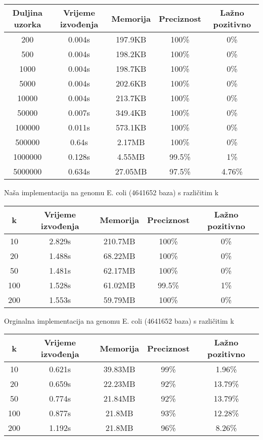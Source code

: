 \documentclass[seminarskirad]{fer}
\begin{document}
\begin{center}
\begin{tabular}{||c c c c c||} 
 \hline
 Duljina uzorka & Vrijeme izvođenja & Memorija & Preciznost & Lažno pozitivno \\ [0.5ex] 
 \hline\hline
 200 & 0.004s & 197.9KB & 100\% & 0\% \\ 
 \hline
 500 & 0.004s & 198.2KB & 100\% & 0\% \\
 \hline
 1000 & 0.004s & 198.7KB & 100\% & 0\% \\
 \hline
 5000 & 0.004s & 202.6KB & 100\% & 0\% \\
 \hline
 10000 & 0.004s & 213.7KB & 100\% & 0\% \\
 \hline
 50000 & 0.007s & 349.4KB & 100\% & 0\% \\ 
 \hline
 100000 & 0.011s & 573.1KB & 100\% & 0\% \\
 \hline
 500000 & 0.64s & 2.17MB & 100\% & 0\% \\
 \hline
 1000000 & 0.128s & 4.55MB & 99.5\% & 1\% \\
 \hline
 5000000 & 0.634s & 27.05MB & 97.5\% & 4.76\% \\ [1ex] 
 \hline
\end{tabular}
\end{center}

Naša implementacija na genomu E. coli (4641652 baza) s različitim k

\begin{center}
\begin{tabular}{||c c c c c||} 
 \hline
 k & Vrijeme izvođenja & Memorija & Preciznost & Lažno pozitivno \\ [0.5ex] 
 \hline\hline
 10 & 2.829s & 210.7MB & 100\% & 0\% \\ 
 \hline
 20 & 1.488s & 68.22MB & 100\% & 0\% \\
 \hline
 50 & 1.481s & 62.17MB & 100\% & 0\% \\
 \hline
 100 & 1.528s & 61.02MB & 99.5\% & 1\% \\
 \hline
 200 & 1.553s & 59.79MB & 100\% & 0\% \\ [1ex] 
 \hline
\end{tabular}
\end{center}

Orginalna implementacija na genomu E. coli (4641652 baza) s različitim k

\begin{center}
\begin{tabular}{||c c c c c||} 
 \hline
 k & Vrijeme izvođenja & Memorija & Preciznost & Lažno pozitivno \\ [0.5ex] 
 \hline\hline
 10 & 0.621s & 39.83MB & 99\% & 1.96\% \\ 
 \hline
 20 & 0.659s & 22.23MB & 92\% & 13.79\% \\
 \hline
 50 & 0.774s & 21.84MB & 92\% & 13.79\% \\
 \hline
 100 & 0.877s & 21.8MB & 93\% & 12.28\% \\
 \hline
 200 & 1.192s & 21.8MB & 96\% & 8.26\% \\ [1ex] 
 \hline
\end{tabular}
\end{center}
\end{document}
